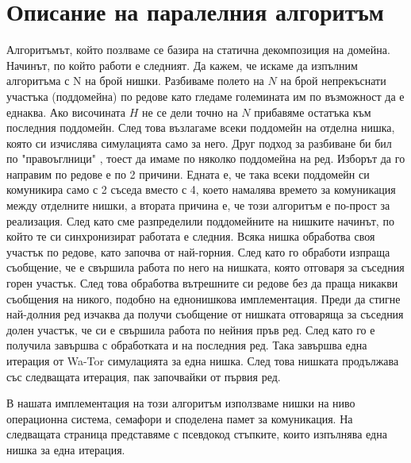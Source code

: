 \documentclass[12pt]{article}
\begin{document}
\section{Описание на паралелния алгоритъм}
Алгоритъмът, който позлваме се базира на статична декомпозиция на домейна.
Начинът, по който работи е следният. Да кажем, че искаме да изпълним алгоритъма с N на брой нишки.
Разбиваме полето на $N$ на брой непрекъснати участъка (поддомейна) по редове като гледаме големината им
по възможност да е еднаква. Ако височината $H$ не се дели точно на $N$ прибавяме остатъка към последния поддомейн.
След това възлагаме всеки поддомейн на отделна нишка, която си изчислява симулацията само за него.
Друг подход за разбиване би бил по "правоъглници" , тоест да имаме по няколко поддомейна на ред.
Изборът да го направим по редове е по 2 причини. Едната е, че така всеки поддомейн си комуникира само
с 2 съседа вместо с 4, което намалява времето за комуникация между отделните нишки, а втората причина
е, че този алгоритъм е по-прост за реализация.
\bigbreak
След като сме разпределили поддомейните на нишките начинът, по който те си синхронизират работата е следния.
Всяка нишка обработва своя участък по редове, като започва от най-горния. След като го обработи изпраща
съобщение, че е свършила работа по него на нишката, която отговаря за съседния горен участък.
След това обработва вътрешните си редове без да праща никакви съобщения на никого, подобно на еднонишкова
имплементация. Преди да стигне най-долния ред изчаква да получи съобщение от нишката отговаряща за съседния
долен участък, че си е свършила работа по нейния пръв ред. След като го е получила завършва с обработката
и на последния ред. Така завършва една итерация от Wa-Tor симулацията за една нишка. След това нишката
продължава със следващата итерация, пак започвайки от първия ред.

В нашата имплементация на този алгоритъм използваме нишки на ниво операционна система, семафори и споделена памет за комуникация.
На следващата страница представяме с псевдокод стъпките, които изпълнява една нишка за една итерация.

\newpage
\end{document}
